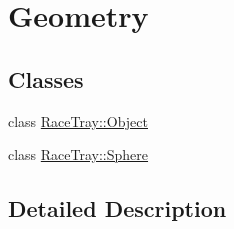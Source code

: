 \hypertarget{group___geometry}{\section{Geometry}
\label{group___geometry}
}
\subsection*{Classes}
\begin{DoxyCompactItemize}
\item 
class \hyperlink{class_race_tray_1_1_object}{Race\-Tray\-::\-Object}
\item 
class \hyperlink{class_race_tray_1_1_sphere}{Race\-Tray\-::\-Sphere}
\end{DoxyCompactItemize}


\subsection{Detailed Description}
